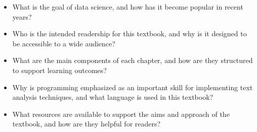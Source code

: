 \documentclass[
  letterpaper,
]{latex/krantz}
\providecommand{\tightlist}{%
  \setlength{\itemsep}{0pt}\setlength{\parskip}{0pt}}\usepackage{longtable,booktabs,array}
\begin{document}
\begin{tcolorbox}[enhanced jigsaw, arc=.35mm, leftrule=.75mm, rightrule=.15mm, opacityback=0, colback=white, breakable, bottomrule=.15mm, left=2mm, toprule=.15mm]
\begin{itemize}
\tightlist
\item
  What is the goal of data science, and how has it become popular in
  recent years?
\item
  Who is the intended readership for this textbook, and why is it
  designed to be accessible to a wide audience?
\item
  What are the main components of each chapter, and how are they
  structured to support learning outcomes?
\item
  Why is programming emphasized as an important skill for implementing
  text analysis techniques, and what language is used in this textbook?
\item
  What resources are available to support the aims and approach of the
  textbook, and how are they helpful for readers?
\end{itemize}

\end{tcolorbox}
\end{document}
